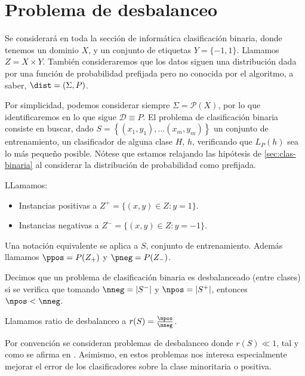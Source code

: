 \label{ch:desbalanceo}
\section{Problema de desbalanceo}
\label{sec:desbalanceo}
Se considerará en toda la sección de informática clasificación binaria, donde tenemos un dominio $X$, y un conjunto de etiquetas 
$Y=\{-1,1\}$. Llamamos $Z = X\times Y$. También consideraremos que los datos siguen una distribución dada por una función de 
probabilidad prefijada pero no conocida por el algoritmo, a saber, $\dist=(\Sigma, P)$. 

Por simplicidad, podemos considerar siempre $\Sigma = \mathcal{P}(X)$, por lo que identificaremos en lo que sigue $\mathcal{D} \equiv P$.
El problema de clasificación binaria consiste en buscar, dado $S= \left\{(x_1, y_1), \ldots (x_m, y_m)\right\}$ un 
conjunto de entrenamiento, un clasificador de alguna clase $H$, $h$, verificando que $L_{P}(h)$ sea lo más pequeño posible.
Nótese que estamos relajando las hipótesis de \ref{sec:clas-binaria} al considerar la distribución de probabilidad como prefijada.

\begin{definition}
LLamamos:
\begin{itemize}
 \item Instancias positivas a $Z^{+} = \{(x,y)\in Z: y=1\}$.
 \item Instancias negativas a $Z^{-} = \{(x,y)\in Z: y=-1\}$.
\end{itemize}
Una notación equivalente se aplica a $S$, conjunto de entrenamiento. Además llamamos $\ppos = P(Z_{+})$ y $\pneg = P(Z_{-})$.
\end{definition}


\begin{definition}
 Decimos que un problema de clasificación binaria es desbalanceado (entre clases) si se verifica que tomando 
 $\nneg = |S^{-}|$ y $\npos = |S^{+}|$, entonces $\npos < \nneg$.
 
 Llamamos ratio de desbalanceo a $r(S)=\frac{\npos}{\nneg}$.
\end{definition}

Por convención se consideran problemas de desbalanceo donde $r(S) \ll 1$, tal y como se afirma en \citep{he2009}. Asimismo,
en estos problemas nos interesa especialmente mejorar el error de los clasificadores sobre la clase minoritaria o positiva.

